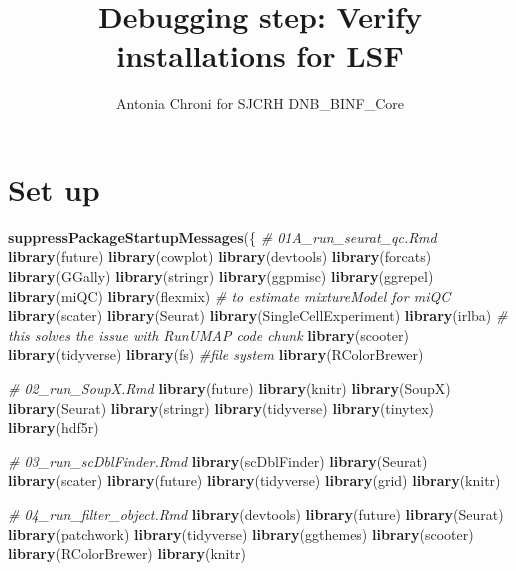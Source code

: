 \documentclass[
  11pt,
  a4paper,
]{article}
\title{Debugging step: Verify installations for LSF}
\author{Antonia Chroni for SJCRH DNB\_BINF\_Core}
\date{}
\newenvironment{Shaded}{\begin{snugshade}}{\end{snugshade}}
\newcommand{\CommentTok}[1]{\textcolor[rgb]{0.56,0.35,0.01}{\textit{#1}}}
\newcommand{\FunctionTok}[1]{\textcolor[rgb]{0.13,0.29,0.53}{\textbf{#1}}}
\newcommand{\NormalTok}[1]{#1}
\begin{document}
\maketitle

{
\hypersetup{linkcolor=}
\setcounter{tocdepth}{2}
\tableofcontents
}
\section{Set up}\label{set-up}

\begin{Shaded}
\begin{Highlighting}[]
\FunctionTok{suppressPackageStartupMessages}\NormalTok{(\{}
  \CommentTok{\# 01A\_run\_seurat\_qc.Rmd}
  \FunctionTok{library}\NormalTok{(future)}
  \FunctionTok{library}\NormalTok{(cowplot)}
  \FunctionTok{library}\NormalTok{(devtools)}
  \FunctionTok{library}\NormalTok{(forcats)}
  \FunctionTok{library}\NormalTok{(GGally)}
  \FunctionTok{library}\NormalTok{(stringr)}
  \FunctionTok{library}\NormalTok{(ggpmisc)}
  \FunctionTok{library}\NormalTok{(ggrepel)}
  \FunctionTok{library}\NormalTok{(miQC) }
  \FunctionTok{library}\NormalTok{(flexmix) }\CommentTok{\# to estimate mixtureModel for miQC}
  \FunctionTok{library}\NormalTok{(scater) }
  \FunctionTok{library}\NormalTok{(Seurat) }
  \FunctionTok{library}\NormalTok{(SingleCellExperiment)}
  \FunctionTok{library}\NormalTok{(irlba) }\CommentTok{\# this solves the issue with RunUMAP code chunk}
  \FunctionTok{library}\NormalTok{(scooter)}
  \FunctionTok{library}\NormalTok{(tidyverse)}
  \FunctionTok{library}\NormalTok{(fs) }\CommentTok{\#file system}
  \FunctionTok{library}\NormalTok{(RColorBrewer)}
  
  \CommentTok{\# 02\_run\_SoupX.Rmd}
  \FunctionTok{library}\NormalTok{(future)}
  \FunctionTok{library}\NormalTok{(knitr)}
  \FunctionTok{library}\NormalTok{(SoupX)}
  \FunctionTok{library}\NormalTok{(Seurat)}
  \FunctionTok{library}\NormalTok{(stringr)}
  \FunctionTok{library}\NormalTok{(tidyverse)}
  \FunctionTok{library}\NormalTok{(tinytex)}
  \FunctionTok{library}\NormalTok{(hdf5r)}

  \CommentTok{\# 03\_run\_scDblFinder.Rmd}
  \FunctionTok{library}\NormalTok{(scDblFinder)}
  \FunctionTok{library}\NormalTok{(Seurat)}
  \FunctionTok{library}\NormalTok{(scater)}
  \FunctionTok{library}\NormalTok{(future)}
  \FunctionTok{library}\NormalTok{(tidyverse)}
  \FunctionTok{library}\NormalTok{(grid)}
  \FunctionTok{library}\NormalTok{(knitr)}

  \CommentTok{\# 04\_run\_filter\_object.Rmd}
  \FunctionTok{library}\NormalTok{(devtools)}
  \FunctionTok{library}\NormalTok{(future)}
  \FunctionTok{library}\NormalTok{(Seurat)}
  \FunctionTok{library}\NormalTok{(patchwork)}
  \FunctionTok{library}\NormalTok{(tidyverse)}
  \FunctionTok{library}\NormalTok{(ggthemes)}
  \FunctionTok{library}\NormalTok{(scooter)}
  \FunctionTok{library}\NormalTok{(RColorBrewer)}
  \FunctionTok{library}\NormalTok{(knitr)}


\end{Highlighting}
\end{Shaded}
\end{document}

